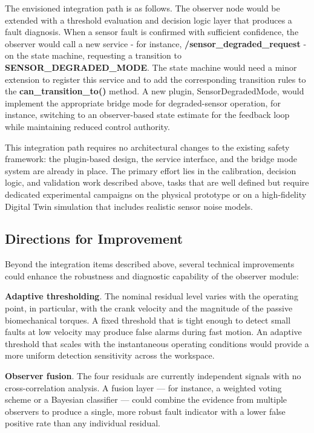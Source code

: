 The envisioned integration path is as follows. The observer node would be extended with a threshold evaluation and decision logic layer that produces a fault diagnosis. When a sensor fault is confirmed with sufficient confidence, the observer would call a new service - for instance, \textbf{/sensor\_degraded\_request} - on the state machine, requesting a transition to \textbf{SENSOR\_DEGRADED\_MODE}. The state machine would need a minor extension to register this service and to add the corresponding transition rules to the \textbf{can\_transition\_to()} method. A new plugin, SensorDegradedMode, would implement the appropriate bridge mode for degraded-sensor operation, for instance, switching to an observer-based state estimate for the feedback loop while maintaining reduced control authority.

This integration path requires no architectural changes to the existing safety framework: the plugin-based design, the service interface, and the bridge mode system are already in place. The primary effort lies in the calibration, decision logic, and validation work described above, tasks that are well defined but require dedicated experimental campaigns on the physical prototype or on a high-fidelity Digital Twin simulation that includes realistic sensor noise models.

\subsection{Directions for Improvement}
Beyond the integration items described above, several technical improvements could enhance the robustness and diagnostic capability of the observer module:

\textbf{Adaptive thresholding}. The nominal residual level varies with the operating point, in particular, with the crank velocity and the magnitude of the passive biomechanical torques. A fixed threshold that is tight enough to detect small faults at low velocity may produce false alarms during fast motion. An adaptive threshold that scales with the instantaneous operating conditions would provide a more uniform detection sensitivity across the workspace.

\textbf{Observer fusion}. The four residuals are currently independent signals with no cross-correlation analysis. A fusion layer — for instance, a weighted voting scheme or a Bayesian classifier — could combine the evidence from multiple observers to produce a single, more robust fault indicator with a lower false positive rate than any individual residual.

